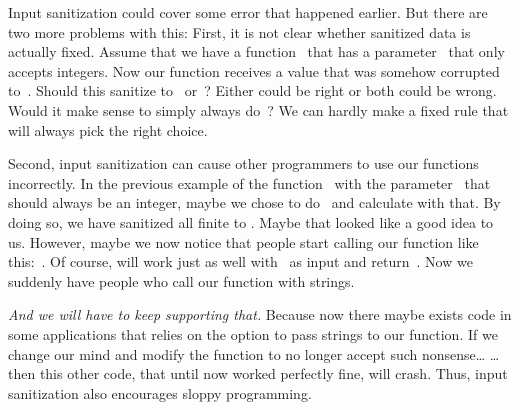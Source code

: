 Input sanitization could cover some error that happened earlier.
But there are two more problems with this:
First, it is not clear whether sanitized data is actually fixed.
Assume that we have a function~ that has a parameter~ that only accepts integers.
Now our function receives a value that was somehow corrupted to~.
Should this sanitize to~ or~?
Either could be right or both could be wrong.
Would it make sense to simply always do~?
We can hardly make a fixed rule that will always pick the right choice.

Second, input sanitization can cause other programmers to use our functions incorrectly.
In the previous example of the function~ with the parameter~ that should always be an integer, maybe we chose to do~ and calculate with that.
By doing so, we have sanitized all finite  to .
Maybe that looked like a good idea to us.
However, maybe we now notice that people start calling our function like this:~.
Of course,  will work just as well with~ as input and return~.
Now we suddenly have people who call our function  with strings.

\emph{And we will have to keep supporting that.}
Because now there maybe exists code in some applications that relies on the option to pass strings to our function.
If we change our mind and modify the function to no longer accept such nonsense{\dots}
{\dots}then this other code, that until now worked perfectly fine, will crash.
Thus, input sanitization also encourages sloppy programming.

